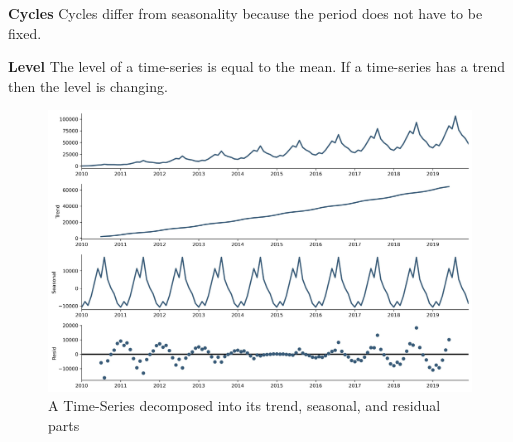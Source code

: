 \textbf{Cycles}
Cycles differ from seasonality because the period does not have to be fixed.


\textbf{Level}
The level of a time-series is equal to the mean. If a time-series has a trend
then the level is changing.


\begin{figure}[h!]
  \centering
  \caption{A Time-Series decomposed into its trend, seasonal, and residual parts}
  \label{fig:example-time-series-decomposed}
  \includegraphics[width=\textwidth]{./figs/illustrations/time-series_example-decomposed.png}
  \hfill
\end{figure}
